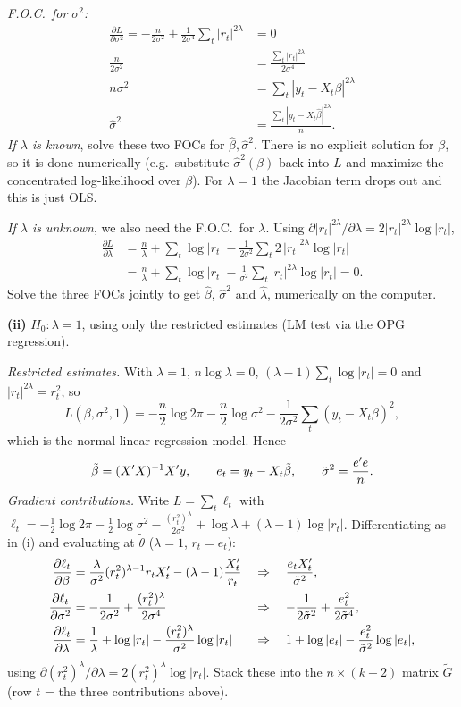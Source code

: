 \documentclass[11pt]{article}
\begin{document}
\emph{F.O.C.\ for $\sigma^2$:}
\begin{align*}
  \frac{\partial L}{\partial\sigma^2}=-\frac{n}{2\sigma^2}+\frac1{2\sigma^4}\sum_t|r_t|^{2\lambda}&=0\\
  \frac{n}{2\sigma^2}&=\frac{\sum_t|r_t|^{2\lambda}}{2\sigma^4}\\
  n\sigma^2&=\sum_t|y_t-X_t\beta|^{2\lambda}\\
  \hat\sigma^2&=\frac{\sum_t|y_t-X_t\hat\beta|^{2\lambda}}{n}.
\end{align*}
\emph{If $\lambda$ is known}, solve these two FOCs for $\hat\beta,\hat\sigma^2$. There is no explicit solution for $\beta$,
so it is done numerically (e.g.\ substitute $\hat\sigma^2(\beta)$ back into $L$ and maximize the concentrated
log-likelihood over $\beta$). For $\lambda=1$ the Jacobian term drops out and this is just OLS.

\emph{If $\lambda$ is unknown}, we also need the F.O.C.\ for $\lambda$. Using $\partial|r_t|^{2\lambda}/\partial\lambda=2|r_t|^{2\lambda}\log|r_t|$,
\begin{align*}
  \frac{\partial L}{\partial\lambda}
  &=\frac{n}{\lambda}+\sum_t\log|r_t|-\frac1{2\sigma^2}\sum_t2\,|r_t|^{2\lambda}\log|r_t|\\
  &=\frac{n}{\lambda}+\sum_t\log|r_t|-\frac1{\sigma^2}\sum_t|r_t|^{2\lambda}\log|r_t|=0 .
\end{align*}
Solve the three FOCs jointly to get $\hat\beta$, $\hat\sigma^2$ and $\hat\lambda$, numerically on the computer.

\medskip
\textbf{(ii)} $H_0:\lambda=1$, using only the restricted estimates (LM test via the OPG regression).

\emph{Restricted estimates.} With $\lambda=1$, $n\log\lambda=0$, $(\lambda-1)\sum_t\log|r_t|=0$ and $|r_t|^{2\lambda}=r_t^2$, so
\[
  L(\beta,\sigma^2,1)=-\frac n2\log2\pi-\frac n2\log\sigma^2-\frac1{2\sigma^2}\sum_t(y_t-X_t\beta)^2 ,
\]
which is the normal linear regression model. Hence
\[
  \tilde\beta=(X^{\prime} X)^{-1}X^{\prime} y,\qquad e_t=y_t-X_t\tilde\beta,\qquad \tilde\sigma^2=\frac{e^{\prime} e}{n}.
\]
\emph{Gradient contributions.} Write $L=\sum_t\ell_t$ with
$\ell_t=-\frac12\log2\pi-\frac12\log\sigma^2-\frac{(r_t^2)^\lambda}{2\sigma^2}+\log\lambda+(\lambda-1)\log|r_t|$.
Differentiating as in (i) and evaluating at $\tilde\theta$ ($\lambda=1$, $r_t=e_t$):
\begin{align*}
  \frac{\partial\ell_t}{\partial\beta}&=\frac{\lambda}{\sigma^2}(r_t^2)^{\lambda-1}r_tX_t^{\prime}-(\lambda-1)\frac{X_t^{\prime}}{r_t}
  &&\Rightarrow\quad \frac{e_tX_t^{\prime}}{\tilde\sigma^2},\\
  \frac{\partial\ell_t}{\partial\sigma^2}&=-\frac1{2\sigma^2}+\frac{(r_t^2)^\lambda}{2\sigma^4}
  &&\Rightarrow\quad -\frac1{2\tilde\sigma^2}+\frac{e_t^2}{2\tilde\sigma^4},\\
  \frac{\partial\ell_t}{\partial\lambda}&=\frac1\lambda+\log|r_t|-\frac{(r_t^2)^\lambda}{\sigma^2}\log|r_t|
  &&\Rightarrow\quad 1+\log|e_t|-\frac{e_t^2}{\tilde\sigma^2}\log|e_t| ,
\end{align*}
using $\partial(r_t^2)^\lambda/\partial\lambda=2(r_t^2)^\lambda\log|r_t|$. Stack these into the $n\times(k+2)$ matrix $\tilde G$ (row $t$ = the three
contributions above).
\end{document}
